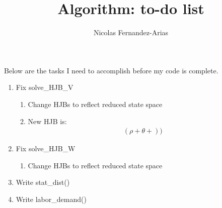 \documentclass[12pt,english]{article}
\theoremstyle{remark}
\begin{document}
\title{Algorithm: to-do list}
\author{Nicolas Fernandez-Arias}
\maketitle

Below are the tasks I need to accomplish before my code is complete.

\begin{enumerate}
	\item Fix solve\_HJB\_V
	\begin{enumerate}
		\item Change HJBs to reflect reduced state space
		\item New HJB is:
		\begin{align*}
		(\rho + \theta + ))
		\end{align*}
	\end{enumerate}
	\item Fix solve\_HJB\_W
	\begin{enumerate}
		\item Change HJBs to reflect reduced state space
	\end{enumerate}
	\item Write stat\_dist()
	\item Write labor\_demand() 
\end{enumerate}
\end{document}
